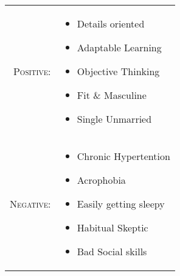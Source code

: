 %
%

\renewcommand{\arraystretch}{1.1}

\begin{tabular}{>{}r>{}p{13cm}}
    \textsc{Positive:} &
        \begin{itemize}
            \item Details oriented
            \item Adaptable Learning
            \item Objective Thinking
            \item Fit \& Masculine
            \item Single Unmarried
        \end{itemize} \\

    \textsc{Negative:} &
        \begin{itemize}
            \item Chronic Hypertention
            \item Acrophobia
            \item Easily getting sleepy
            \item Habitual Skeptic
            \item Bad Social skills
        \end{itemize} \\
\end{tabular}

